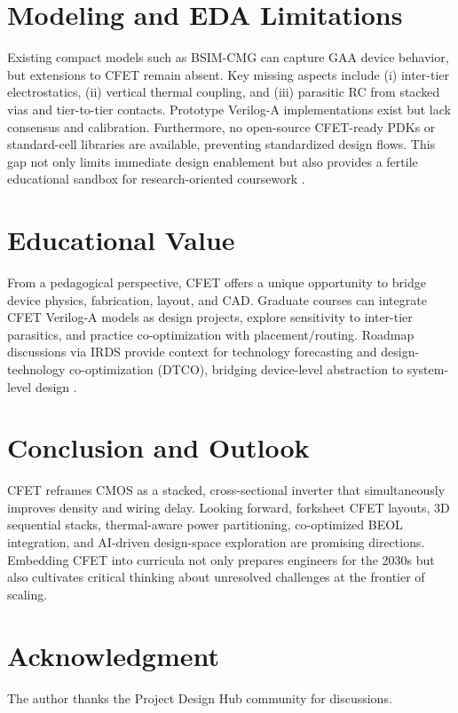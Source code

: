\documentclass[conference]{IEEEtran}
\begin{document}
\section{Modeling and EDA Limitations}
Existing compact models such as BSIM-CMG can capture GAA device behavior, but extensions to CFET remain absent.
Key missing aspects include (i) inter-tier electrostatics, (ii) vertical thermal coupling, and (iii) parasitic RC from stacked vias and tier-to-tier contacts.
Prototype Verilog-A implementations exist but lack consensus and calibration.
Furthermore, no open-source CFET-ready PDKs or standard-cell libraries are available, preventing standardized design flows.
This gap not only limits immediate design enablement but also provides a fertile educational sandbox for research-oriented coursework \cite{bsimcmg_sispad2017}.

\section{Educational Value}
From a pedagogical perspective, CFET offers a unique opportunity to bridge device physics, fabrication, layout, and CAD.
Graduate courses can integrate CFET Verilog-A models as design projects, explore sensitivity to inter-tier parasitics, and practice co-optimization with placement/routing.
Roadmap discussions via IRDS provide context for technology forecasting and design-technology co-optimization (DTCO), bridging device-level abstraction to system-level design \cite{irds_2023}.

\section{Conclusion and Outlook}
CFET reframes CMOS as a stacked, cross-sectional inverter that simultaneously improves density and wiring delay.
Looking forward, forksheet CFET layouts, 3D sequential stacks, thermal-aware power partitioning, co-optimized BEOL integration, and AI-driven design-space exploration are promising directions.
Embedding CFET into curricula not only prepares engineers for the 2030s but also cultivates critical thinking about unresolved challenges at the frontier of scaling.

\section*{Acknowledgment}
The author thanks the Project Design Hub community for discussions.
\end{document}
